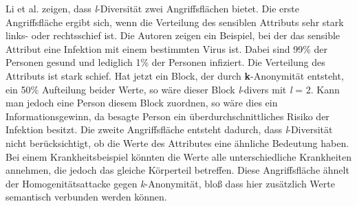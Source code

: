 Li et al. \cite{P-25} zeigen, dass \textit{l}-Diversität zwei Angriffsflächen bietet.
Die erste Angriffsfläche ergibt sich, wenn die Verteilung des sensiblen Attributs sehr stark links- oder rechtsschief ist.
Die Autoren zeigen ein Beispiel, bei der das sensible Attribut eine Infektion mit einem bestimmten Virus ist.
Dabei sind 99\% der Personen gesund und lediglich 1\% der Personen infiziert. 
Die Verteilung des Attributs ist stark schief. 
Hat jetzt ein Block, der durch \textbf{k}-Anonymität entsteht, ein 50\% Aufteilung beider Werte, so wäre dieser Block \textit{l}-divers mit \textit{l} = 2. 
Kann man jedoch eine Person diesem Block zuordnen, so wäre dies ein Informationsgewinn, da besagte Person ein überdurchschnittliches Risiko der Infektion besitzt.
Die zweite Angriffsfläche entsteht dadurch, dass \textit{l}-Diversität nicht berücksichtigt, ob die Werte des Attributes eine ähnliche Bedeutung haben.
Bei einem Krankheitsbeispiel könnten die Werte alle unterschiedliche Krankheiten annehmen, die jedoch das gleiche Körperteil betreffen.
Diese Angriffsfläche ähnelt der Homogenitätsattacke gegen \textit{k}-Anonymität, bloß dass hier zusätzlich Werte semantisch verbunden werden können.

